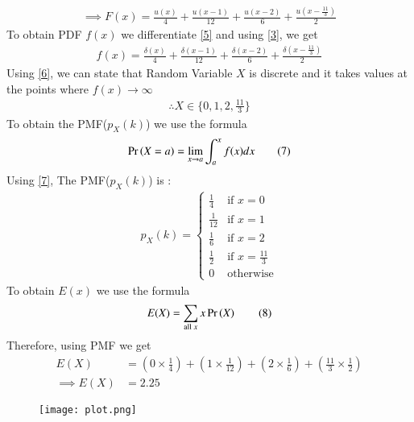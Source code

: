 \documentclass[journal,12pt,twocolumn]{IEEEtran}
\begin{document}
\begin{align*}
\implies F(x)=\frac{u(x)}{4}+\frac{u(x-1)}{12}+\frac{u(x-2)}{6}+\frac{u(x-\frac{11}{3})}{2} \tag{5} \label{5}
\end{align*}
\textrightarrow To obtain PDF $f(x)$ we differentiate \eqref{5} and using \eqref{3}, we get
\begin{align*}
f(x)=\frac{\delta(x)}{4}+\frac{\delta(x-1)}{12}+\frac{\delta(x-2)}{6}+\frac{\delta(x-\frac{11}{3})}{2} \tag{6} \label{6}
\end{align*}
\textrightarrow Using \eqref{6}, we can state that Random Variable $X$ is discrete and it takes values at the points where $f(x) \to \infty$ \\
\begin{align*}
\therefore X \in \{0, 1, 2, \frac{11}{3}\}
\end{align*}
\textrightarrow To obtain the PMF($p_X(k)$) we use the formula
\begin{align*}
\Pr\left(X=a\right) = \lim_{x\to a}\int_{a}^{x}f(x)dx \tag{7} \label{7}
\end{align*}
\textrightarrow Using \eqref{7}, The PMF($p_X(k)$) is :
\begin{align*}
p_X(k)=
\begin{cases}
\frac{1}{4} & \text{if } x=0 \\
\frac{1}{12} & \text{if } x=1 \\
\frac{1}{6} & \text{if } x=2 \\
\frac{1}{2} & \text{if } x=\frac{11}{3} \\
0 & \text{otherwise}
\end{cases}
\end{align*}
\textrightarrow To obtain $E(x)$ we use the formula
\begin{align*}
E(X) = \sum _{\text{all }x} x\Pr\left(X\right) \tag{8} \end{align*}
\textrightarrow Therefore, using PMF we get
\begin{align*}
E(X)& = (0\times \frac{1}{4}) + (1\times \frac{1}{12}) + (2\times \frac{1}{6}) + (\frac{11}{3}\times \frac{1}{2}) \\
\implies E(X) &= 2.25
\end{align*}
\newpage
\begin{figure}[h!]
    \centering
    \texttt{[image: plot.png]}
    \label{fig:1}
\end{figure}
\end{document}
